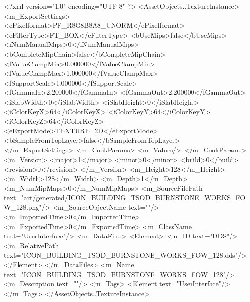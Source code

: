 <?xml version="1.0" encoding="UTF-8" ?>
<AssetObjects..TextureInstance>
	<m_ExportSettings>
		<ePixelformat>PF_R8G8B8A8_UNORM</ePixelformat>
		<eFilterType>FT_BOX</eFilterType>
		<bUseMips>false</bUseMips>
		<iNumManualMips>0</iNumManualMips>
		<bCompleteMipChain>false</bCompleteMipChain>
		<fValueClampMin>0.000000</fValueClampMin>
		<fValueClampMax>1.000000</fValueClampMax>
		<fSupportScale>1.000000</fSupportScale>
		<fGammaIn>2.200000</fGammaIn>
		<fGammaOut>2.200000</fGammaOut>
		<iSlabWidth>0</iSlabWidth>
		<iSlabHeight>0</iSlabHeight>
		<iColorKeyX>64</iColorKeyX>
		<iColorKeyY>64</iColorKeyY>
		<iColorKeyZ>64</iColorKeyZ>
		<eExportMode>TEXTURE_2D</eExportMode>
		<bSampleFromTopLayer>false</bSampleFromTopLayer>
	</m_ExportSettings>
	<m_CookParams>
		<m_Values/>
	</m_CookParams>
	<m_Version>
		<major>1</major>
		<minor>0</minor>
		<build>0</build>
		<revision>0</revision>
	</m_Version>
	<m_Height>128</m_Height>
	<m_Width>128</m_Width>
	<m_Depth>1</m_Depth>
	<m_NumMipMaps>0</m_NumMipMaps>
	<m_SourceFilePath text="art/generated/ICON_BUILDING_TSOD_BURNSTONE_WORKS_FOW_128.png"/>
	<m_SourceObjectName text=""/>
	<m_ImportedTime>0</m_ImportedTime>
	<m_ExportedTime>0</m_ExportedTime>
	<m_ClassName text="UserInterface"/>
	<m_DataFiles>
		<Element>
			<m_ID text="DDS"/>
			<m_RelativePath text="ICON_BUILDING_TSOD_BURNSTONE_WORKS_FOW_128.dds"/>
		</Element>
	</m_DataFiles>
	<m_Name text="ICON_BUILDING_TSOD_BURNSTONE_WORKS_FOW_128"/>
	<m_Description text=""/>
	<m_Tags>
		<Element text="UserInterface"/>
	</m_Tags>
</AssetObjects..TextureInstance>
